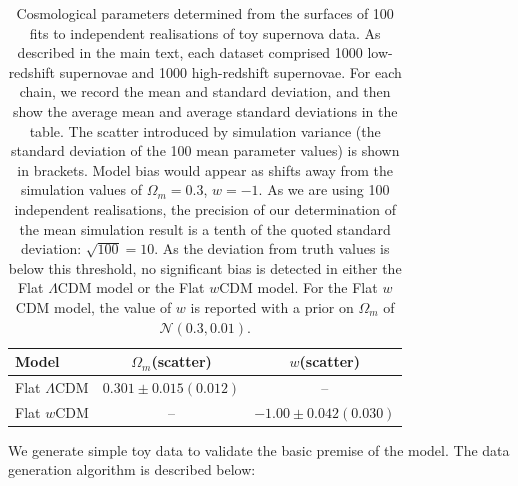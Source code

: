 \documentclass[a4paper,fleqn,usenatbib]{mnras}
\begin{document}
\begin{table}
	\centering
	\caption{Cosmological parameters determined from the surfaces of 100 fits to independent realisations of toy supernova data. As described in the main text, each dataset comprised 1000 low-redshift supernovae and 1000 high-redshift supernovae. For each chain, we record the mean and standard deviation, and then show the average mean and average standard deviations in the table. The scatter introduced by simulation variance (the standard deviation of the 100 mean parameter values) is shown in brackets. Model bias would appear as shifts away from the simulation values of $\Omega_m = 0.3$, $w = -1$. As we are using 100 independent realisations, the precision of our determination of the mean simulation result is a tenth of the quoted standard deviation: $\sqrt{100} = 10$. As the deviation from truth values is below this threshold, no significant bias is detected in either the Flat $\Lambda$CDM model or the Flat $w$CDM model. For the Flat $w$CDM model, the value of $w$ is reported with a prior on $\Omega_m$ of $\mathcal{N}(0.3, 0.01)$.}
	\label{tab:simple_model}
	\begin{tabular}{l|cc}
		\hline
		Model & $\Omega_m$(scatter) & $w$(scatter) \\ 
		\hline
		Flat $\Lambda$CDM & $0.301\pm 0.015(0.012)$ & -- \\ 
		Flat $w$CDM & -- & $-1.00\pm 0.042(0.030)$ \\ 
		\hline
	\end{tabular}
\end{table}

We generate simple toy data to validate the basic premise of the model. The data generation algorithm is described below:
\end{document}
